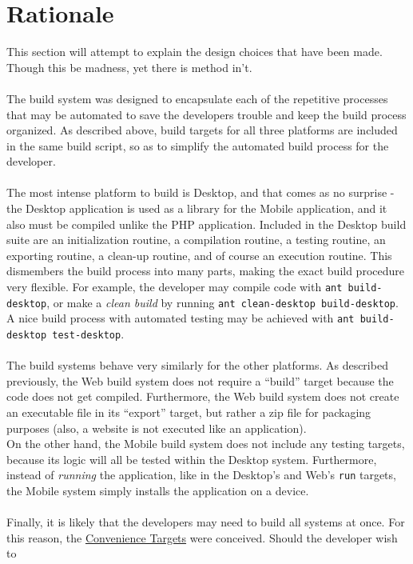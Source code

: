 \documentclass[12pt]{report}
\begin{document}
\section{Rationale}
This section will attempt to explain the design choices that have been made. Though this be madness,
yet there is method in't.\\\\
The build system was designed to encapsulate each of the repetitive processes that may be automated
to save the developers trouble and keep the build process organized. As described above, build
targets for all three platforms are included in the same build script, so as to simplify the
automated build process for the developer.\\\\
The most intense platform to build is Desktop, and that comes as no surprise - the Desktop
application is used as a library for the Mobile application, and it also must be compiled unlike the
PHP application. Included in the Desktop build suite are an initialization routine, a compilation
routine, a testing routine, an exporting routine, a clean-up routine, and of course an execution
routine. This dismembers the build process into many parts, making the exact build procedure very
flexible. For example, the developer may compile code with \texttt{ant build-desktop}, or make a
\textit{clean build} by running \texttt{ant clean-desktop build-desktop}. A nice build process with
automated testing may be achieved with \texttt{ant build-desktop test-desktop}.\\\\
The build systems behave very similarly for the other platforms. As described previously, the Web
build system does not require a ``build'' target because the code does not get compiled.
Furthermore, the Web build system does not create an executable file in its ``export'' target, but
rather a zip file for packaging purposes (also, a website is not executed like an application).\\
On the other hand, the Mobile build system does not include any testing targets, because its logic
will all be tested within the Desktop system. Furthermore, instead of \textit{running} the
application, like in the Desktop's and Web's \texttt{run} targets, the Mobile system simply installs
the application on a device.\\\\
Finally, it is likely that the developers may need to build all systems at once. For this reason,
the \hyperref[s:build-convenience]{Convenience Targets} were conceived. Should the developer wish to
\end{document}
